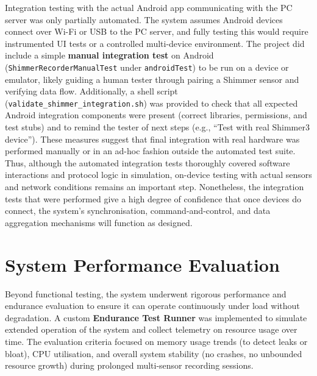 Integration testing with the actual Android app communicating with the PC server was only partially automated. The system assumes Android devices connect over Wi-Fi or USB to the PC server, and fully testing this would require instrumented UI tests or a controlled multi-device environment. The project did include a simple \textbf{manual integration test} on Android (\texttt{ShimmerRecorderManualTest} under \texttt{androidTest}) to be run on a device or emulator, likely guiding a human tester through pairing a Shimmer sensor and verifying data flow. Additionally, a shell script (\texttt{validate\_shimmer\_integration.sh}) was provided to check that all expected Android integration components were present (correct libraries, permissions, and test stubs) and to remind the tester of next steps (e.g., ``Test with real Shimmer3 device''). These measures suggest that final integration with real hardware was performed manually or in an ad-hoc fashion outside the automated test suite. Thus, although the automated integration tests thoroughly covered software interactions and protocol logic in simulation, on-device testing with actual sensors and network conditions remains an important step. Nonetheless, the integration tests that were performed give a high degree of confidence that once devices do connect, the system's synchronisation, command-and-control, and data aggregation mechanisms will function as designed.


\section{System Performance Evaluation}
Beyond functional testing, the system underwent rigorous performance and endurance evaluation to ensure it can operate continuously under load without degradation. A custom \textbf{Endurance Test Runner} was implemented to simulate extended operation of the system and collect telemetry on resource usage over time. The evaluation criteria focused on memory usage trends (to detect leaks or bloat), CPU utilisation, and overall system stability (no crashes, no unbounded resource growth) during prolonged multi-sensor recording sessions.

